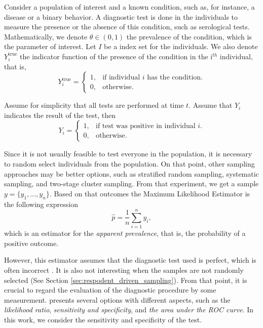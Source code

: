 Consider a population of interest and a known condition, such as, for instance,
a disease or a binary behavior. A diagnostic test is done in the individuals
to measure the presence or the absence of this condition, such as serological
tests. Mathematically, we denote
$\theta \in (0,1)$ the prevalence of the condition, which is the parameter of
interest. Let $I$ be a index set for the individuals. We also denote $Y^{\mathrm{true}}_i$ the indicator function of the presence of the
condition in the i$^{th}$ individual, that is, 
$$Y^{\mathrm{true}}_i = \begin{cases}
  1, &\text{if individual } i \text{ has the condition.} \\
  0, &\text{otherwise.}
\end{cases}$$

Assume for simplicity that all tests are performed at time $t$. Assume that
$Y_i$ indicates the result of the test, then 
$$Y_i = \begin{cases}
  1, &\text{if test was positive in individual } i. \\
  0, &\text{otherwise.}
\end{cases}$$

Since it is not usually feasible to test everyone in the population, it is
necessary to random select individuals from the population. On that point,
other sampling approaches may be better options, such as stratified random
sampling, systematic sampling, and two-stage cluster sampling. From that
experiment, we get a sample $y = \{y_1, ..., y_n\}$. Based on that outcomes the Maximum Likelihood Estimator is the following expression 
\begin{equation}
    \label{eq:naive-estimator}
    \hat{p} = \frac{1}{n}\sum_{i=1}^n y_i, 
\end{equation}
which is an estimator for the {\em apparent prevalence}, that is, the
probability of a positive outcome. 

However, this estimator assumes that the diagnostic test used is perfect,
which is often incorrect . It is also not
interesting when the samples are not randomly selected (See Section
\ref{sec:respodent_driven_sampling}). From that point, it is crucial to regard
the evaluation of the diagnostic procedure by some measurement. \textcite[p.
2]{vsimundic2009measures} presents several options with different aspects,
such as the {\em likelihood ratio}, {\em sensitivity and specificity}, and
{\em the area under the ROC curve}. In this work, we consider the sensitivity
and specificity of the test. 

